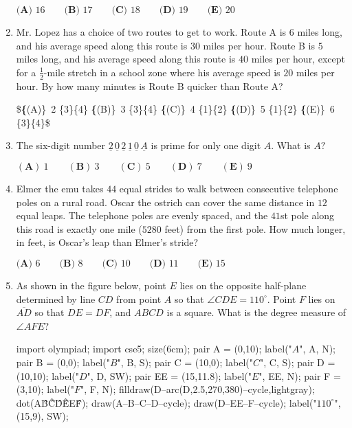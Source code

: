 \documentclass{article}
\begin{document}
\begin{enumerate}[label=\arabic*., itemsep=0.5em]
$\textbf{(A) }16\qquad\textbf{(B) }17\qquad\textbf{(C) }18\qquad\textbf{(D) }19\qquad\textbf{(E) }20$\par \vspace{0.5em}\item Mr. Lopez has a choice of two routes to get to work. Route A is $6$ miles long, and his average speed along this route is $30$ miles per hour. Route B is $5$ miles long, and his average speed along this route is $40$ miles per hour, except for a $\frac{1}{2}$-mile stretch in a school zone where his average speed is $20$ miles per hour. By how many minutes is Route B quicker than Route A?

\$\textbf\{(A)\}\ 2 \frac\{3\}\{4\}  \qquad\textbf\{(B)\}\  3 \frac\{3\}\{4\} \qquad\textbf\{(C)\}\  4 \frac\{1\}\{2\} \qquad\textbf\{(D)\}\
 5 \frac\{1\}\{2\} \qquad\textbf\{(E)\}\ 6 \frac\{3\}\{4\}\$\par \vspace{0.5em}\item The six-digit number $\underline{2}\,\underline{0}\,\underline{2}\,\underline{1}\,\underline{0}\,\underline{A}$ is prime for only one digit $A.$ What is $A?$

$(\textbf{A})\: 1\qquad(\textbf{B}) \: 3\qquad(\textbf{C}) \: 5 \qquad(\textbf{D}) \: 7\qquad(\textbf{E}) \: 9$\par \vspace{0.5em}\item Elmer the emu takes $44$ equal strides to walk between consecutive telephone poles on a rural road. Oscar the ostrich can cover the same distance in $12$ equal leaps. The telephone poles are evenly spaced, and the $41$st pole along this road is exactly one mile ($5280$ feet) from the first pole. How much longer, in feet, is Oscar's leap than Elmer's stride?

$\textbf{(A) }6\qquad\textbf{(B) }8\qquad\textbf{(C) }10\qquad\textbf{(D) }11\qquad\textbf{(E) }15$\par \vspace{0.5em}\item As shown in the figure below, point $E$ lies on the opposite half-plane determined by line $CD$ from point $A$ so that $\angle CDE = 110^\circ$. Point $F$ lies on $\overline{AD}$ so that $DE=DF$, and $ABCD$ is a square. What is the degree measure of $\angle AFE$?


\begin{center}
\begin{asy}
import olympiad;
import cse5;
size(6cm);
pair A = (0,10);
label("$A$", A, N);
pair B = (0,0);
label("$B$", B, S);
pair C = (10,0);
label("$C$", C, S);
pair D = (10,10);
label("$D$", D, SW);
pair EE = (15,11.8);
label("$E$", EE, N);
pair F = (3,10);
label("$F$", F, N);
filldraw(D--arc(D,2.5,270,380)--cycle,lightgray);
dot(A\^\^B\^\^C\^\^D\^\^EE\^\^F);
draw(A--B--C--D--cycle);
draw(D--EE--F--cycle);
label("$110^\circ$", (15,9), SW);
\end{asy}
\end{center}



\end{enumerate}
\end{document}

